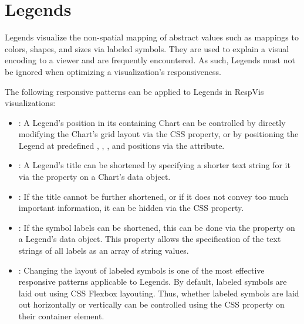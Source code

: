 \section{Legends}
\label{sec:LegendsUsage}

Legends visualize the non-spatial mapping of abstract values such as
mappings to colors, shapes, and sizes via labeled symbols. They are
used to explain a visual encoding to a viewer and are frequently
encountered. As such, Legends must not be ignored when optimizing a
visualization's responsiveness.

The following responsive patterns can be applied to Legends in RespVis
visualizations:
\begin{itemize}
\item {}: A Legend's position in its containing
  Chart can be controlled by directly modifying the Chart's grid
  layout via the CSS  property, or by positioning
  the Legend at predefined , ,
  , and  positions via the
   attribute.

\item {}: A Legend's title can be shortened by
  specifying a shorter text string for it via the 
  property on a Chart's data object.

\item {}: If the title cannot be further
  shortened, or if it does not convey too much important information,
  it can be hidden via the CSS  property.

\item {}: If the symbol labels can be
  shortened, this can be done via the  property on a
  Legend's data object. This property allows the specification of the
  text strings of all labels as an array of string values.

\item {}: Changing the layout of
  labeled symbols is one of the most effective responsive patterns
  applicable to Legends. By default, labeled symbols are laid out
  using CSS Flexbox layouting. Thus, whether labeled symbols are laid
  out horizontally or vertically can be controlled using the CSS
   property on their container element.
\end{itemize}







